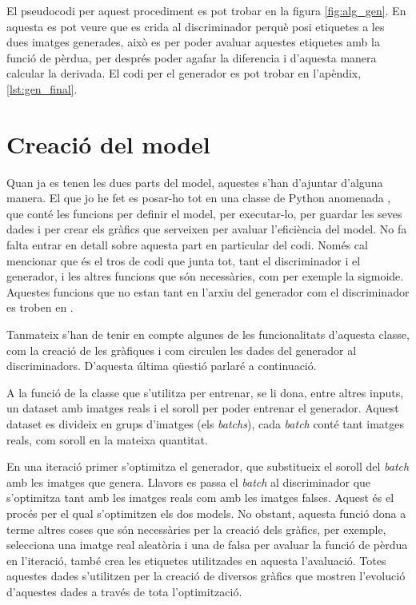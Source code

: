 El pseudocodi per aquest procediment es pot trobar en la figura \ref{fig:alg_gen}. En aquesta es pot veure que es crida al discriminador perquè posi etiquetes a les dues imatges generades, això es per poder avaluar aquestes etiquetes amb la funció de pèrdua, per després poder agafar la diferencia i d'aquesta manera calcular la derivada. El codi per el generador es pot trobar en l'apèndix, \ref{lst:gen_final}.

\section{Creació del model}

Quan ja es tenen les dues parts del model, aquestes s'han d'ajuntar d'alguna manera. El que jo he fet es posar-ho tot en una classe de Python anomenada , que conté les funcions per definir el model, per executar-lo, per guardar les seves dades i per crear els gràfics que serveixen per avaluar l'eficiència del model. No fa falta entrar en detall sobre aquesta part en particular del codi. Només cal mencionar que és el tros de codi que junta tot, tant el discriminador i el generador, i les altres funcions que són necessàries, com per exemple la sigmoide. Aquestes funcions que no estan tant en l'arxiu del generador com el discriminador es troben en . 

Tanmateix s'han de tenir en compte algunes de les funcionalitats d'aquesta classe, com la creació de les gràfiques i com circulen les dades del generador al discriminadors. D'aquesta última qüestió parlaré a continuació.

A la funció de la classe  que s'utilitza per entrenar,  se li dona, entre altres inputs, un dataset amb imatges reals i el soroll per poder entrenar el generador. Aquest dataset es divideix en grups d'imatges (els \textit{batchs}), cada \textit{batch} conté tant imatges reals, com soroll en la mateixa quantitat.

En una iteració primer s'optimitza el generador, que substitueix el soroll del \textit{batch} amb les imatges que genera. Llavors es passa el \textit{batch} al discriminador que s'optimitza tant amb les imatges reals com amb les imatges falses. Aquest és el procés per el qual s'optimitzen els dos models. No obstant, aquesta funció dona a terme altres coses que són necessàries per la creació dels gràfics, per exemple, selecciona una imatge real aleatòria i una de falsa per avaluar la funció de pèrdua en l'iteració, també crea les etiquetes utilitzades en aquesta l'avaluació. Totes aquestes dades s'utilitzen per la creació de diversos gràfics que mostren l'evolució d'aquestes dades a través de tota l'optimització.

